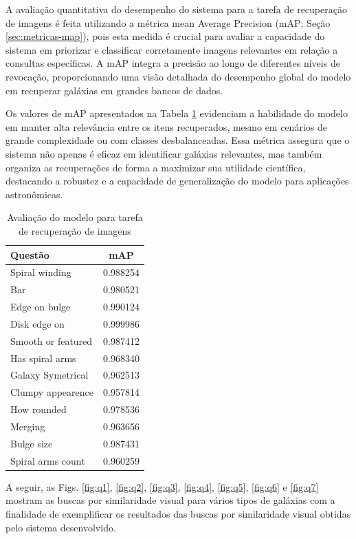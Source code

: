 A avaliação quantitativa do desempenho do sistema para a tarefa de recuperação de imagens é feita utilizando a métrica mean Average Precision (mAP; Seção \ref{sec:metricas-map}), pois esta medida é crucial para avaliar a capacidade do sistema em priorizar e classificar corretamente imagens relevantes em relação a consultas específicas. A mAP integra a precisão ao longo de diferentes níveis de revocação, proporcionando uma visão detalhada do desempenho global do modelo em recuperar galáxias em grandes bancos de dados.

Os valores de mAP apresentados na Tabela \ref{tab:test-map} evidenciam a habilidade do modelo em manter alta relevância entre os itens recuperados, mesmo em cenários de grande complexidade ou com classes desbalanceadas. Essa métrica assegura que o sistema não apenas é eficaz em identificar galáxias relevantes, mas também organiza as recuperações de forma a maximizar sua utilidade científica, destacando a robustez e a capacidade de generalização do modelo para aplicações astronômicas.

\begin{table}[!ht]
  \centering
  \caption{Avaliação do modelo para tarefa de recuperação de imagens}
  \label{tab:test-map}
  \begin{tabular}{lc}
    \toprule
    Questão            & mAP      \\
    \midrule
    Spiral winding     & 0.988254 \\
    Bar                & 0.980521 \\
    Edge on bulge      & 0.990124 \\
    Disk edge on       & 0.999986 \\
    Smooth or featured & 0.987412 \\
    Has spiral arms    & 0.968340 \\
    Galaxy Symetrical  & 0.962513 \\
    Clumpy appearence  & 0.957814 \\
    How rounded        & 0.978536 \\
    Merging            & 0.963656 \\
    Bulge size         & 0.987431 \\
    Spiral arms count  & 0.960259 \\
    \bottomrule
  \end{tabular}
\end{table}


A seguir, as Figs. \ref{fig:q1}, \ref{fig:q2}, \ref{fig:q3}, \ref{fig:q4}, \ref{fig:q5}, \ref{fig:q6} e \ref{fig:q7} mostram as buscas por similaridade visual para vários tipos de galáxias com a finalidade de exemplificar os resultados das buscas por similaridade visual obtidas pelo sistema desenvolvido.


